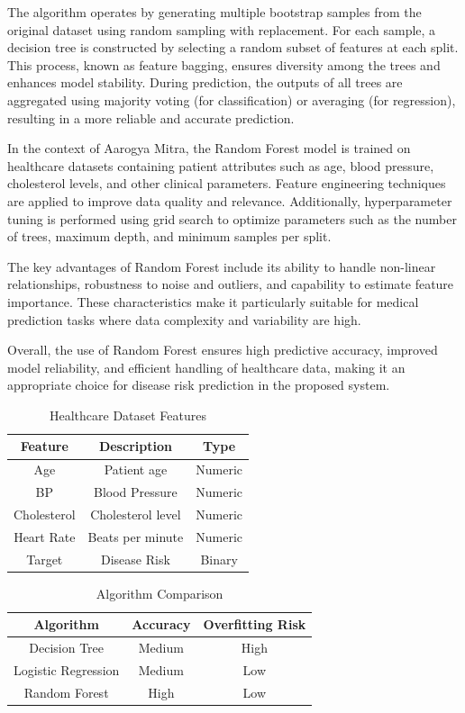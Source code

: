 \documentclass[conference]{IEEEtran}
\begin{document}
The algorithm operates by generating multiple bootstrap samples from the original dataset using random sampling with replacement. For each sample, a decision tree is constructed by selecting a random subset of features at each split. This process, known as feature bagging, ensures diversity among the trees and enhances model stability. During prediction, the outputs of all trees are aggregated using majority voting (for classification) or averaging (for regression), resulting in a more reliable and accurate prediction.

In the context of Aarogya Mitra, the Random Forest model is trained on healthcare datasets containing patient attributes such as age, blood pressure, cholesterol levels, and other clinical parameters. Feature engineering techniques are applied to improve data quality and relevance. Additionally, hyperparameter tuning is performed using grid search to optimize parameters such as the number of trees, maximum depth, and minimum samples per split.

The key advantages of Random Forest include its ability to handle non-linear relationships, robustness to noise and outliers, and capability to estimate feature importance. These characteristics make it particularly suitable for medical prediction tasks where data complexity and variability are high.

Overall, the use of Random Forest ensures high predictive accuracy, improved model reliability, and efficient handling of healthcare data, making it an appropriate choice for disease risk prediction in the proposed system.

\begin{table}[htbp]
\caption{Healthcare Dataset Features}
\centering
\begin{tabular}{|c|c|c|}
\hline
Feature & Description & Type \\
\hline
Age & Patient age & Numeric \\
BP & Blood Pressure & Numeric \\
Cholesterol & Cholesterol level & Numeric \\
Heart Rate & Beats per minute & Numeric \\
Target & Disease Risk & Binary \\
\hline
\end{tabular}
\end{table}

\begin{table}[htbp]
\caption{Algorithm Comparison}
\centering
\begin{tabular}{|c|c|c|}
\hline
Algorithm & Accuracy & Overfitting Risk \\
\hline
Decision Tree & Medium & High \\
Logistic Regression & Medium & Low \\
Random Forest & High & Low \\
\hline
\end{tabular}
\end{table}
 
\end{document}
